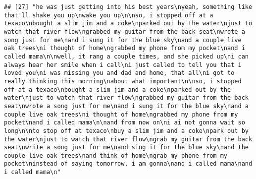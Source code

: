 \documentclass[]{article}
\begin{document}
\begin{verbatim}
## [27] "he was just getting into his best years\nyeah, something like that'll shake you up\nwake you up\n\nso, i stopped off at a texaco\nbought a slim jim and a coke\nparked out by the water\njust to watch that river flow\ngrabbed my guitar from the back seat\nwrote a song just for me\nand i sung it for the blue sky\nand a couple live oak trees\ni thought of home\ngrabbed my phone from my pocket\nand i called mama\n\nwell, it rang a couple times, and she picked up\ni can always hear her smile when i call\ni just called to tell you that i loved you\ni was missing you and dad and home, that all\ni got to really thinking this morning\nabout what important\n\nso, i stopped off at a texaco\nbought a slim jim and a coke\nparked out by the water\njust to watch that river flow\ngrabbed my guitar from the back seat\nwrote a song just for me\nand i sung it for the blue sky\nand a couple live oak trees\ni thought of home\ngrabbed my phone from my pocket\nand i called mama\n\nand from now on\ni ai not gonna wait so long\n\nto stop off at texaco\nbuy a slim jim and a coke\npark out by the water\njust to watch that river flow\ngrab my guitar from the back seat\nwrite a song just for me\nand sing it for the blue sky\nand the couple live oak trees\nand think of home\ngrab my phone from my pocket\ninstead of saying tomorrow, i am gonna\nand i called mama\nand i called mama\n"                                                                                                                                                                                                                                                                                                                                                                                                                                                                                                                                                                                                                                                                                                                                                                                                                                                                                                                                                                                                                                                                                                                                                                                                                                                                                                                                                                                                                                                                                                                                                    

\end{verbatim}
\end{document}
